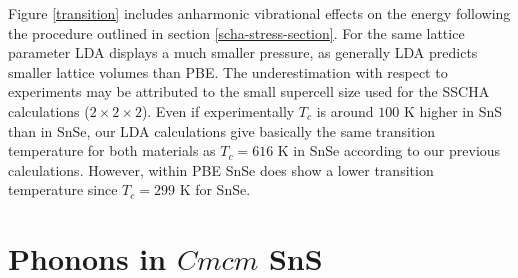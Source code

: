 Figure \ref{transition} includes anharmonic vibrational effects on the energy following the procedure outlined in section \ref{scha-stress-section}. For the same lattice parameter LDA displays a much smaller pressure, as
generally LDA predicts smaller lattice volumes than PBE. The underestimation with respect to experiments may be attributed to the small supercell size used for the SSCHA calculations ($2\times2\times2$). Even if
experimentally $T_{c}$ is around $100$ K higher in SnS than in SnSe, our LDA calculations give basically the same transition temperature for both materials as $T_{c}=616$ K in SnSe according to our previous
calculations\cite{aseginolaza2019phonon}. However, within PBE SnSe does show a lower transition temperature since $T_c=299$ K for SnSe\cite{aseginolaza2019phonon}.

\section{Phonons in $Cmcm$ SnS}

